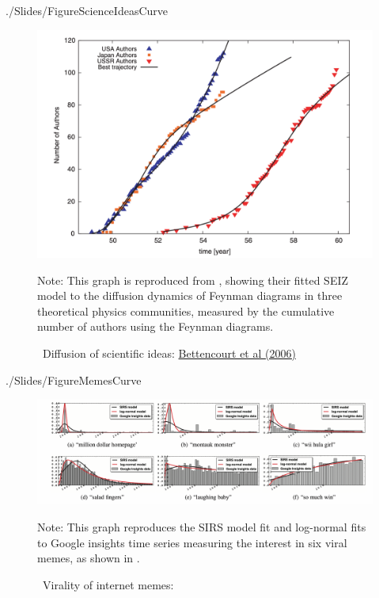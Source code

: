 \newpage


\begin{verbatimwrite}{./Slides/FigureScienceIdeasCurve}
\begin{figure}[!ht] \centering  %
	\caption{ ~Diffusion of scientific ideas: \href{http://web.mit.edu/dikaiser/www/BAKC.PhysA.pdf}{Bettencourt et al (2006)}}\nocite{bettencourt2006power}
	\label{fig:science_ideas_curve}
	\centerline{\includegraphics[width=\textwidth]{./figures/Feynman}}
		\begin{flushleft}{\footnotesize Note: This graph is reproduced from \cite{bettencourt2006power}, showing their fitted SEIZ model to the diffusion dynamics of Feynman diagrams in three theoretical physics communities, measured by the cumulative number of authors using the Feynman diagrams.}
	\end{flushleft}
\end{figure}
\end{verbatimwrite}%


\newpage

\begin{verbatimwrite}{./Slides/FigureMemesCurve}
\begin{figure}[!ht] \centering  %
	\caption{ ~Virality of internet memes: \href{https://github.com/iworld1991/EpiExp/blob/master/Literature/bauckhage2011insights.pdf}{\cite{bauckhage2011insights}}}
	\label{fig:memes_curve}
	\centerline{\includegraphics[width=\textwidth]{./figures/Memes}}
	\begin{flushleft}{\footnotesize Note: This graph reproduces the SIRS model fit and log-normal fits to Google insights time series measuring the interest in six viral memes, as shown in  \cite{bauckhage2011insights}. }
\end{flushleft}
\end{figure}
\end{verbatimwrite}%

